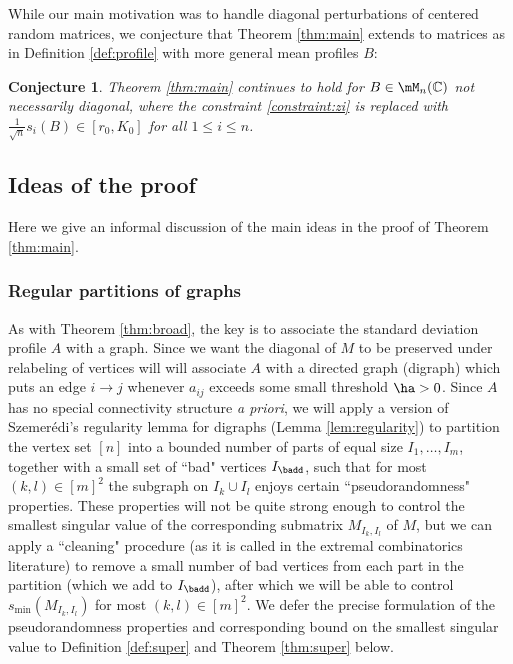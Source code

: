 \documentclass[aop,preprint]{imsart}
\theoremstyle{plain}
\newtheorem{conjecture}[theorem]{Conjecture}
\theoremstyle{definition}
\theoremstyle{remark}
\numberwithin{equation}{section}
\numberwithin{theorem}{section}
\begin{document}
While our main motivation was to handle diagonal perturbations of centered random matrices, we conjecture that Theorem \ref{thm:main} extends to matrices as in Definition \ref{def:profile} with more general mean profiles $B$:

\begin{conjecture}	\label{conj:main}
Theorem \ref{thm:main} continues to hold for $B\in \mM_n(\C)$ not necessarily diagonal, where the constraint \eqref{constraint:zi} is replaced with $\frac1{\sqrt{n}}s_i(B)\in [r_0,K_0]$ for all $1\le i\le n$. 
\end{conjecture}



\subsection{Ideas of the proof}		\label{sec:ideas}

Here we give an informal discussion of the main ideas in the proof of Theorem \ref{thm:main}.


\subsubsection*{Regular partitions of graphs}

As with Theorem \ref{thm:broad}, the key is to associate the standard deviation profile $A$ with a graph. 
Since we want the diagonal of $M$ to be preserved under relabeling of vertices will will associate $A$ with a directed graph (digraph) which puts an edge $i\to j$ whenever $a_{ij}$ exceeds some small threshold $\ha>0$.
Since $A$ has no special connectivity structure \emph{a priori}, we will apply a version of Szemer\'edi's regularity lemma for digraphs (Lemma \ref{lem:regularity}) to partition the vertex set $[n]$ into a bounded number of parts of equal size $I_1,\dots, I_m$, together with a small set of ``bad" vertices $I_{\badd}$, such that for most $(k,l)\in [m]^2$ the subgraph on $I_k\cup I_l$ enjoys certain ``pseudorandomness" properties.
These properties will not be quite strong enough to control the smallest singular value of the corresponding submatrix $M_{I_k,I_l}$ of $M$, but we can apply a ``cleaning" procedure (as it is called in the extremal combinatorics literature) to remove a small number of bad vertices from each part in the partition (which we add to $I_{\badd}$), after which we will be able to control $s_{\min}(M_{I_k,I_l})$ for most $(k,l)\in [m]^2$.
We defer the precise formulation of the pseudorandomness properties and corresponding bound on the smallest singular value to Definition \ref{def:super} and Theorem \ref{thm:super} below.
\end{document}

